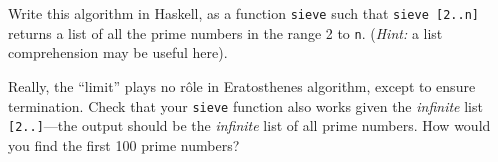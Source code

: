 \documentclass{article}
\begin{document}
Write this algorithm in Haskell, as a function \verb!sieve! such that
\verb!sieve [2..n]! returns a list of all the prime numbers in the
range 2 to \verb!n!. ({\em Hint:} a list comprehension may be useful
here). 

Really, the ``limit'' plays no r\^ole in Eratosthenes algorithm,
except to ensure termination. Check that your \verb!sieve! function
also works given the {\em infinite} list \verb![2..]!---the output
should be the {\em infinite} list of all prime numbers. How would you
find the first 100 prime numbers?
\end{document}
